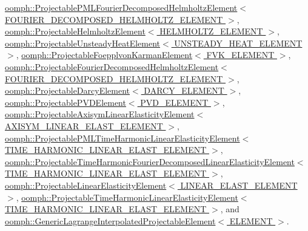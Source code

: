 \hyperlink{classoomph_1_1ProjectablePMLFourierDecomposedHelmholtzElement_a1802d1737bb3af15f79a8581880c1b55}{oomph\+::\+Projectable\+P\+M\+L\+Fourier\+Decomposed\+Helmholtz\+Element$<$ F\+O\+U\+R\+I\+E\+R\+\_\+\+D\+E\+C\+O\+M\+P\+O\+S\+E\+D\+\_\+\+H\+E\+L\+M\+H\+O\+L\+T\+Z\+\_\+\+E\+L\+E\+M\+E\+N\+T $>$}, \hyperlink{classoomph_1_1ProjectableHelmholtzElement_ada5e8cc58f2c0be72da7b66e07d174be}{oomph\+::\+Projectable\+Helmholtz\+Element$<$ H\+E\+L\+M\+H\+O\+L\+T\+Z\+\_\+\+E\+L\+E\+M\+E\+N\+T $>$}, \hyperlink{classoomph_1_1ProjectableUnsteadyHeatElement_ad3c589c0bd97ac402919e426e5ee0e6b}{oomph\+::\+Projectable\+Unsteady\+Heat\+Element$<$ U\+N\+S\+T\+E\+A\+D\+Y\+\_\+\+H\+E\+A\+T\+\_\+\+E\+L\+E\+M\+E\+N\+T $>$}, \hyperlink{classoomph_1_1ProjectableFoepplvonKarmanElement_ad4d911152c2f5e648f7f6558e53d4c9b}{oomph\+::\+Projectable\+Foepplvon\+Karman\+Element$<$ F\+V\+K\+\_\+\+E\+L\+E\+M\+E\+N\+T $>$}, \hyperlink{classoomph_1_1ProjectableFourierDecomposedHelmholtzElement_aa978ab56d0673a25ac99e9477198d942}{oomph\+::\+Projectable\+Fourier\+Decomposed\+Helmholtz\+Element$<$ F\+O\+U\+R\+I\+E\+R\+\_\+\+D\+E\+C\+O\+M\+P\+O\+S\+E\+D\+\_\+\+H\+E\+L\+M\+H\+O\+L\+T\+Z\+\_\+\+E\+L\+E\+M\+E\+N\+T $>$}, \hyperlink{classoomph_1_1ProjectableDarcyElement_a7c003fb90c5a5892ce176b67f3cf18a0}{oomph\+::\+Projectable\+Darcy\+Element$<$ D\+A\+R\+C\+Y\+\_\+\+E\+L\+E\+M\+E\+N\+T $>$}, \hyperlink{classoomph_1_1ProjectablePVDElement_acd838813683d89c331dab13ba6d5726a}{oomph\+::\+Projectable\+P\+V\+D\+Element$<$ P\+V\+D\+\_\+\+E\+L\+E\+M\+E\+N\+T $>$}, \hyperlink{classoomph_1_1ProjectableAxisymLinearElasticityElement_a449c2dd77bc7f66fac46affb6223a04b}{oomph\+::\+Projectable\+Axisym\+Linear\+Elasticity\+Element$<$ A\+X\+I\+S\+Y\+M\+\_\+\+L\+I\+N\+E\+A\+R\+\_\+\+E\+L\+A\+S\+T\+\_\+\+E\+L\+E\+M\+E\+N\+T $>$}, \hyperlink{classoomph_1_1ProjectablePMLTimeHarmonicLinearElasticityElement_a7459a06e5c3dd6a91286408e8d407bf8}{oomph\+::\+Projectable\+P\+M\+L\+Time\+Harmonic\+Linear\+Elasticity\+Element$<$ T\+I\+M\+E\+\_\+\+H\+A\+R\+M\+O\+N\+I\+C\+\_\+\+L\+I\+N\+E\+A\+R\+\_\+\+E\+L\+A\+S\+T\+\_\+\+E\+L\+E\+M\+E\+N\+T $>$}, \hyperlink{classoomph_1_1ProjectableTimeHarmonicFourierDecomposedLinearElasticityElement_aba8a4c3e1fdaed3fa059c55d7c021ff5}{oomph\+::\+Projectable\+Time\+Harmonic\+Fourier\+Decomposed\+Linear\+Elasticity\+Element$<$ T\+I\+M\+E\+\_\+\+H\+A\+R\+M\+O\+N\+I\+C\+\_\+\+L\+I\+N\+E\+A\+R\+\_\+\+E\+L\+A\+S\+T\+\_\+\+E\+L\+E\+M\+E\+N\+T $>$}, \hyperlink{classoomph_1_1ProjectableLinearElasticityElement_a0311cfae0d3bf571be30bee3c848543c}{oomph\+::\+Projectable\+Linear\+Elasticity\+Element$<$ L\+I\+N\+E\+A\+R\+\_\+\+E\+L\+A\+S\+T\+\_\+\+E\+L\+E\+M\+E\+N\+T $>$}, \hyperlink{classoomph_1_1ProjectableTimeHarmonicLinearElasticityElement_a773b3f4a6cf431ca3a95248f6f9766e6}{oomph\+::\+Projectable\+Time\+Harmonic\+Linear\+Elasticity\+Element$<$ T\+I\+M\+E\+\_\+\+H\+A\+R\+M\+O\+N\+I\+C\+\_\+\+L\+I\+N\+E\+A\+R\+\_\+\+E\+L\+A\+S\+T\+\_\+\+E\+L\+E\+M\+E\+N\+T $>$}, and \hyperlink{classoomph_1_1GenericLagrangeInterpolatedProjectableElement_ab1d0d99536b2d4f1c935d39d01a943fa}{oomph\+::\+Generic\+Lagrange\+Interpolated\+Projectable\+Element$<$ E\+L\+E\+M\+E\+N\+T $>$}.



